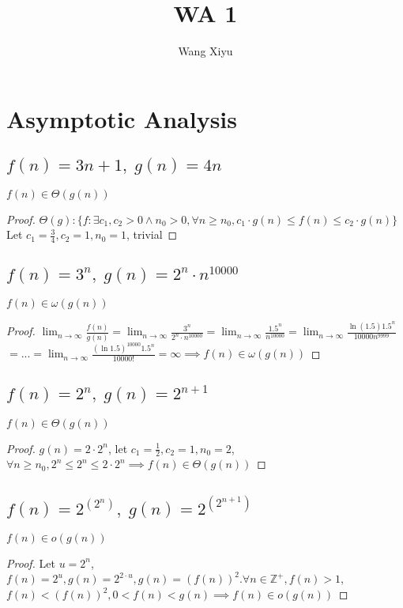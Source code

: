 \documentclass{article}
\begin{document}
\title{WA 1}
\author{Wang Xiyu}
\date{}
\maketitle

\section{Asymptotic Analysis}
\subsection{$f(n) = 3n + 1,\; g(n) = 4n$}
$f(n) \in \Theta(g(n))$
\begin{proof}
    $\Theta(g): \{f: \exists c_1, c_2 > 0 \land n_0 > 0, \forall n \geq n_0, c_1 \cdot g(n) \leq f(n) \leq c_2 \cdot g(n)\}$ \\

    Let $c_1 = \frac{3}{4}, c_2 = 1, n_0 = 1$, trivial
\end{proof}
\subsection{$f(n) = 3^n,\; g(n) = 2^n \cdot n^{10000}$}
$f(n) \in \omega(g(n))$
\begin{proof}
    $\lim_{n \rightarrow \infty} \frac{f(n)}{g(n)} = \lim_{n \rightarrow \infty}
     \frac{3^n}{2^n \cdot n^{10000}} = \lim_{n \rightarrow \infty} \frac{1.5^n}{n^{10000}} 
     = \lim_{n \rightarrow \infty} \frac{\ln(1.5)1.5^n}{10000n^{9999}}$\\
     $= ... = \lim_{n \rightarrow \infty} \frac{(\ln 1.5)^{10000}1.5^n}{10000!} = \infty \implies f(n) \in \omega(g(n))$
\end{proof}
\subsection{$f(n) = 2^n,\; g(n) = 2^{n+1}$}
$f(n) \in \Theta(g(n))$
\begin{proof}
    $g(n) = 2\cdot 2^n$, let $c_1 = \frac{1}{2}, c_2 = 1, n_0 = 2$, \\
    $\forall n \geq n_0, 2^n \leq 2^n \leq 2\cdot 2^n \implies f(n) \in \Theta(g(n))$
\end{proof}
\subsection{$f(n) = 2^{(2^n)},\; g(n) = 2^{(2^{n+1})}$}
$f(n) \in o(g(n))$
\begin{proof}
    Let $u = 2^n$, $f(n) = 2^u, g(n) = 2^{2\cdot u}, g(n) = (f(n))^2. \forall n \in \mathbb{Z}^+, f(n) > 1$,\\
    $f(n) < (f(n))^2, 0 < f(n) < g(n) \implies f(n) \in o(g(n))$
\end{proof}
\end{document}
